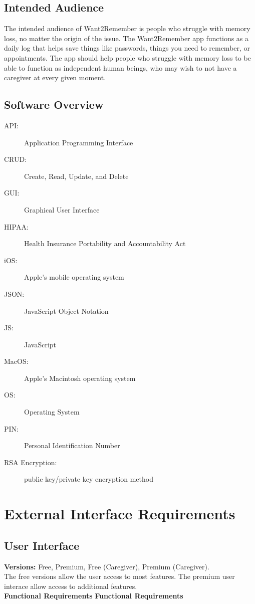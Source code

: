\documentclass{article}
\begin{document}
\subsection{Intended Audience}
The intended audience of Want2Remember is people who struggle with memory loss, no matter the origin of the issue. The Want2Remember app functions as a daily log that helps save things like passwords, things you need to remember, or appointments. The app should help people who struggle with memory loss to be able to function as independent human beings, who may wish to not have a caregiver at every given moment. 

\subsection{Software Overview}
\begin{description}
\item[API:] Application Programming Interface
\item[CRUD:] Create, Read, Update, and Delete
\item[GUI:] Graphical User Interface
\item[HIPAA:] Health Insurance Portability and Accountability Act
\item[iOS:] Apple’s mobile operating system
\item[JSON:] JavaScript Object Notation
\item[JS:] JavaScript
\item[MacOS:] Apple’s Macintosh operating system
\item[OS:] Operating System
\item[PIN:] Personal Identification Number
\item[RSA Encryption:] public key/private key encryption method
\end{description}




\section{External Interface Requirements}
\subsection{User Interface}
\textbf{Versions:} Free, Premium, Free (Caregiver), Premium (Caregiver). \\
The free versions allow the user access to most features. The premium user interace allow access to additional features. \\
\textbf{Functional Requirements}
\textbf{Functional Requirements}
\setcounter{subsubsection}{0}
\end{document}
